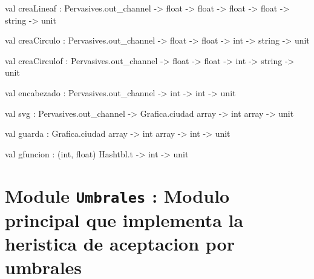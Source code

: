 \documentclass[11pt]{article}
\begin{document}
\label{val:Svg.creaLineaf}\begin{ocamldoccode}
val creaLineaf :
  Pervasives.out_channel -> float -> float -> float -> float -> string -> unit
\end{ocamldoccode}




\label{val:Svg.creaCirculo}\begin{ocamldoccode}
val creaCirculo :
  Pervasives.out_channel -> float -> float -> int -> string -> unit
\end{ocamldoccode}




\label{val:Svg.creaCirculof}\begin{ocamldoccode}
val creaCirculof :
  Pervasives.out_channel -> float -> float -> int -> string -> unit
\end{ocamldoccode}




\label{val:Svg.encabezado}\begin{ocamldoccode}
val encabezado : Pervasives.out_channel -> int -> int -> unit
\end{ocamldoccode}




\label{val:Svg.svg}\begin{ocamldoccode}
val svg : Pervasives.out_channel -> Grafica.ciudad array -> int array -> unit
\end{ocamldoccode}




\label{val:Svg.guarda}\begin{ocamldoccode}
val guarda : Grafica.ciudad array -> int array -> int -> unit
\end{ocamldoccode}




\label{val:Svg.gfuncion}\begin{ocamldoccode}
val gfuncion : (int, float) Hashtbl.t -> int -> unit
\end{ocamldoccode}


\section{Module {\tt{Umbrales}} : Modulo principal que implementa la heristica de aceptacion por umbrales}
\label{module:Umbrales}
\end{document}
